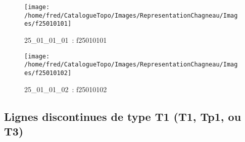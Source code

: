 \documentclass[12pt,titlepage]{book}
\begin{document}
\begin{figure}[h!]
  \hfill         %
  \begin{minipage}[t]{3cm}
    \begin{center}
      \texttt{[image: /home/fred/CatalogueTopo/Images/RepresentationChagneau/Images/f25010101]}
      \caption[~25\_01\_01\_01]{\small{25\_01\_01\_01~:} \tiny{f25010101}}\label{f25010101}
    \end{center}
  \end{minipage}
  \begin{minipage}[t]{3cm}
    \begin{center}
      \texttt{[image: /home/fred/CatalogueTopo/Images/RepresentationChagneau/Images/f25010102]}
      \caption[~25\_01\_01\_02]{\small{25\_01\_01\_02~:} \tiny{f25010102}}\label{f25010102}
    \end{center}
  \end{minipage}
\end{figure}


\subsection{Lignes discontinues de type T1 (T1, Tp1, ou T3)}
\noindent
\vspace{\baselineskip}
\end{document}
